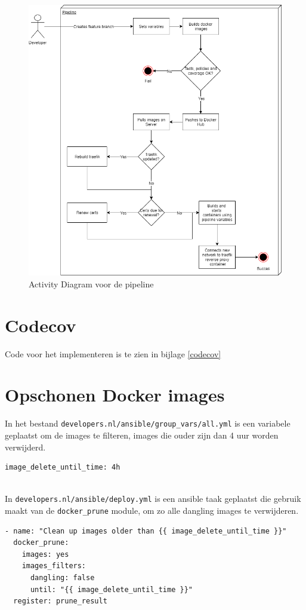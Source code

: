 \begin{figure}[h]
	\centering
	\includegraphics[width=13cm]{Figures/Activitydiagram}
	\decoRule
	\caption[Pipeline Activity Diagram]{Activity Diagram voor de pipeline}
	\label{fig:activitydiagram}
\end{figure}

\section{Codecov}
Code voor het implementeren is te zien in bijlage \ref{codecov}

\section{Opschonen Docker images}
In het bestand \texttt{developers.nl/ansible/group\_vars/all.yml} is een variabele geplaatst om de images te filteren, images die ouder zijn dan 4 uur worden verwijderd.
\begin{verbatim}
image_delete_until_time: 4h
\end{verbatim}
\\In \texttt{developers.nl/ansible/deploy.yml} is een ansible taak geplaatst die gebruik maakt van de \texttt{docker\_prune} module, om zo alle dangling images te verwijderen.
\begin{verbatim}
- name: "Clean up images older than {{ image_delete_until_time }}"
  docker_prune:
    images: yes
    images_filters:
      dangling: false
      until: "{{ image_delete_until_time }}"
  register: prune_result
\end{verbatim}
